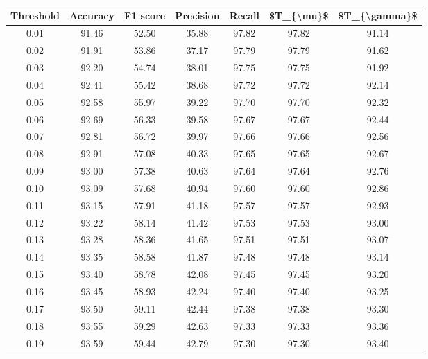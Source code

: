 \begin{tabular}{|c|c|c|c|c|c|c|}
\hline
 Threshold &  Accuracy &  F1 score &  Precision &  Recall &  \$T\_\{\textbackslash mu\}\$ &  \$T\_\{\textbackslash gamma\}\$ \\
\hline
      0.01 &     91.46 &     52.50 &      35.88 &   97.82 &      97.82 &         91.14 \\
      0.02 &     91.91 &     53.86 &      37.17 &   97.79 &      97.79 &         91.62 \\
      0.03 &     92.20 &     54.74 &      38.01 &   97.75 &      97.75 &         91.92 \\
      0.04 &     92.41 &     55.42 &      38.68 &   97.72 &      97.72 &         92.14 \\
      0.05 &     92.58 &     55.97 &      39.22 &   97.70 &      97.70 &         92.32 \\
      0.06 &     92.69 &     56.33 &      39.58 &   97.67 &      97.67 &         92.44 \\
      0.07 &     92.81 &     56.72 &      39.97 &   97.66 &      97.66 &         92.56 \\
      0.08 &     92.91 &     57.08 &      40.33 &   97.65 &      97.65 &         92.67 \\
      0.09 &     93.00 &     57.38 &      40.63 &   97.64 &      97.64 &         92.76 \\
      0.10 &     93.09 &     57.68 &      40.94 &   97.60 &      97.60 &         92.86 \\
      0.11 &     93.15 &     57.91 &      41.18 &   97.57 &      97.57 &         92.93 \\
      0.12 &     93.22 &     58.14 &      41.42 &   97.53 &      97.53 &         93.00 \\
      0.13 &     93.28 &     58.36 &      41.65 &   97.51 &      97.51 &         93.07 \\
      0.14 &     93.35 &     58.58 &      41.87 &   97.48 &      97.48 &         93.14 \\
      0.15 &     93.40 &     58.78 &      42.08 &   97.45 &      97.45 &         93.20 \\
      0.16 &     93.45 &     58.93 &      42.24 &   97.40 &      97.40 &         93.25 \\
      0.17 &     93.50 &     59.11 &      42.44 &   97.38 &      97.38 &         93.30 \\
      0.18 &     93.55 &     59.29 &      42.63 &   97.33 &      97.33 &         93.36 \\
      0.19 &     93.59 &     59.44 &      42.79 &   97.30 &      97.30 &         93.40 \\

\end{tabular}
